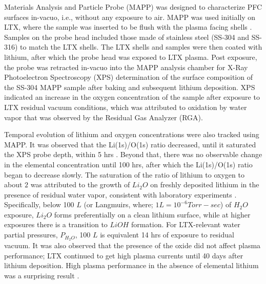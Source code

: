 \documentclass[aip,rsi,amsmath,amssymb,reprint]{revtex4-1}
\begin{document}
Materials Analysis and Particle Probe (MAPP) was designed to characterize PFC surfaces in-vacuo, i.e., without any exposure to air. MAPP was used initially on LTX, where the sample was inserted to be flush with    the  plasma  facing  shells  \cite{lucia-paper, lucia-thesis}.   Samples  on  the  probe  head  included those  made of stainless steel (SS-304 and SS-316) to match the LTX shells. The LTX shells and samples were then coated with lithium, after which the probe head was exposed to LTX plasma. Post exposure, the probe was retracted in-vacuo into the MAPP analysis chamber for X-Ray Photoelectron Spectroscopy (XPS) determination of the surface composition of the SS-304 MAPP sample after baking and subsequent lithium deposition. XPS indicated an increase in the oxygen concentration  of the sample after exposure to LTX residual vacuum conditions, which was attributed to oxidation by water vapor that was observed by the Residual Gas Analyzer (RGA).


Temporal evolution of lithium and oxygen concentrations were also tracked using MAPP. It was observed that the Li(1s)/O(1s) ratio decreased, until it saturated the XPS probe depth, within 5 hrs \cite{lucia-thesis,lucia-paper}. Beyond that, there was no observable change in the elemental concentration until 100 hrs, after which the Li(1s)/O(1s) ratio began to decrease slowly. The saturation of the ratio of lithium to oxygen to about $2$ was attributed to the growth of $Li_2O$ on freshly deposited lithium in the presence of residual water vapor, consistent with laboratory experiments \cite{50,51}.  Specifically, below 100 $L$ (or Langmuirs, where; $1 L = 10^{-6}Torr-sec$) of $H_2O$ exposure, $Li_2O$ forms preferentially on a clean lithium surface, while at higher exposures there is a transition to $LiOH$ formation. For LTX-relevant water partial pressures, $P_{H_2O}$, 100 $L$ is equivalent 14 hrs of exposure to residual vacuum. It was also observed that the presence of the oxide did not affect plasma performance; LTX continued to get high plasma currents until 40 days after lithium deposition. High plasma performance in the absence of elemental lithium was a surprising result \cite{bob-lucia}. 
\end{document}
